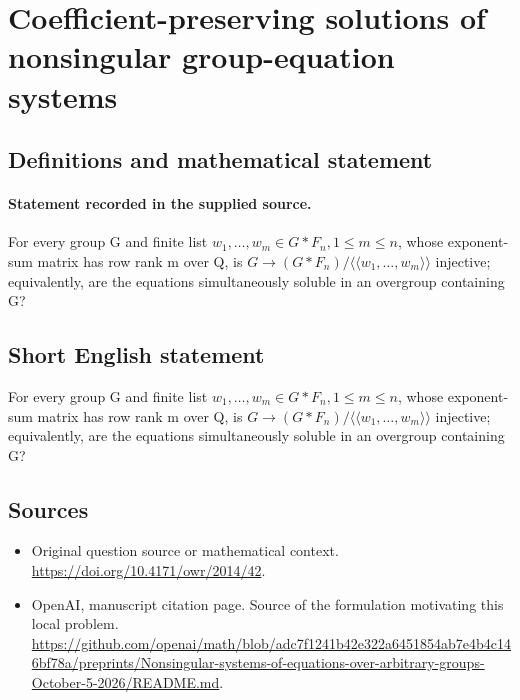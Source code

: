 \documentclass[11pt]{article}
\begin{document}
\section*{Coefficient-preserving solutions of nonsingular group-equation systems}\label{30007198}
\subsection{Definitions and mathematical statement}
\paragraph{Statement recorded in the supplied source.}
For every group G and finite list $w_{1},\dots ,w_m\in G*F_n,1\leq m\leq n$, whose exponent-sum matrix has row rank m over Q, is $G\to (G*F_n)/\langle \langle w_{1},\dots ,w_m\rangle \rangle $ injective; equivalently, are the equations simultaneously soluble in an overgroup containing G?
\subsection{Short English statement}
For every group G and finite list $w_{1},\dots ,w_m\in G*F_n,1\leq m\leq n$, whose exponent-sum matrix has row rank m over Q, is $G\to (G*F_n)/\langle \langle w_{1},\dots ,w_m\rangle \rangle $ injective; equivalently, are the equations simultaneously soluble in an overgroup containing G?
\subsection{Sources}
\begin{itemize}
\item[S1] Original question source or mathematical context.
\url{https://doi.org/10.4171/owr/2014/42}.
\item[S2] OpenAI, manuscript citation page. Source of the formulation motivating this local problem.
\url{https://github.com/openai/math/blob/adc7f1241b42e322a6451854ab7e4b4c146bf78a/preprints/Nonsingular-systems-of-equations-over-arbitrary-groups-October-5-2026/README.md}.
\end{itemize}
\end{document}
